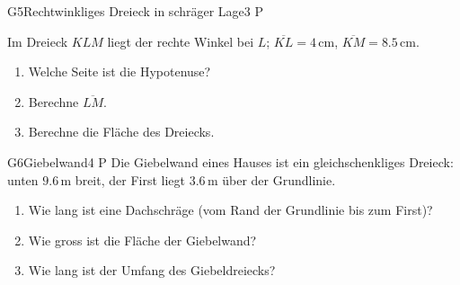 \documentclass[11pt]{article}
\begin{document}
\begin{lpaufgabe}{G5}{Rechtwinkliges Dreieck in schräger Lage}{3 P}
\begin{minipage}[t]{0.60\linewidth}\vspace{0pt}
Im Dreieck $KLM$ liegt der rechte Winkel bei $L$; $\overline{KL} = 4\,\text{cm}$, $\overline{KM} = 8.5\,\text{cm}$.
\begin{enumerate}[label=(\alph*),leftmargin=*,itemsep=2pt]
\item Welche Seite ist die Hypotenuse?
\item Berechne $\overline{LM}$.
\item Berechne die Fläche des Dreiecks.
\end{enumerate}
\end{minipage}\hfill
\begin{minipage}[t]{0.36\linewidth}\vspace{0pt}\centering
{}
\end{minipage}
\end{lpaufgabe}

\begin{lpaufgabe}{G6}{Giebelwand}{4 P}
Die Giebelwand eines Hauses ist ein gleichschenkliges Dreieck: unten $9.6\,\text{m}$ breit, der First liegt $3.6\,\text{m}$ über der Grundlinie.
\begin{enumerate}[label=(\alph*),leftmargin=*,itemsep=2pt]
\item Wie lang ist eine Dachschräge (vom Rand der Grundlinie bis zum First)?
\item Wie gross ist die Fläche der Giebelwand?
\item Wie lang ist der Umfang des Giebeldreiecks?
\end{enumerate}
\end{lpaufgabe}
\end{document}
